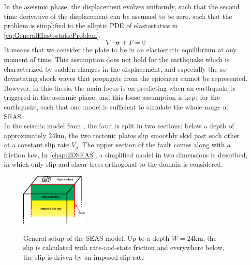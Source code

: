 In the aseismic phase, the displacement evolves uniformly, such that the second time derivative of the displacement can be assumed to be zero, such that the problem is simplified to the elliptic PDE of elastostatics in \autoref{eq:GeneralElastostaticProblem}.
\begin{equation}
\label{eq:GeneralElastostaticProblem}
\nabla \cdot \mathbf{\sigma} + F = 0
\end{equation}
It means that we consider the plate to be in an elastostatic equilibrium at any moment of time. This assumption does not hold for the earthquake which is characterized by sudden changes in the displacement, and especially the so devastating shock waves that propagate from the epicenter cannot be represented. However, in this thesis, the main focus is on predicting when an earthquake is triggered in the aseismic phase, and this loose assumption is kept for the earthquake, such that one model is sufficient to simulate the whole range of SEAS. \\

In the seismic model from \cite{MechanicsOfEarthquakeRupture}, the fault is split in two sections: below a depth of approximately $24$km, the two tectonic plates slip smoothly skid past each other at a constant slip rate $V_p$. The upper section of the fault comes along with a friction law, In \autoref{chap:2DSEAS}, a simplified model in two dimensions is described, in which only slip and shear tress orthogonal to the domain is considered. 

\begin{figure}[H]
	\centering
	\includegraphics[width=0.3\textwidth]{images/generalSEASModel.png}
	\label{fig:general3DSEASModel}
	\caption{General setup of the SEAS model. Up to a depth $W=24$km, the slip is calculated with rate-and-state friction and everywhere below, the slip is driven by an imposed slip rate}
\end{figure}

